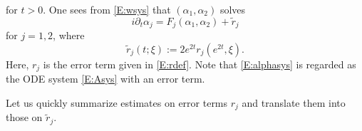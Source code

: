 \documentclass[11pt,a4paper,oneside]{amsart}
\theoremstyle{plain}
\theoremstyle{remark}
\numberwithin{equation}{section}
\theoremstyle{definition}
\begin{document}
for $t >0$. 
One sees from \eqref{E:wsys} that $(\alpha_1,\alpha_2)$
solves
\begin{equation}\label{E:alphasys}
	i \partial_t \alpha_j
	= 
	 F_j(\alpha_1,\alpha_2) + \widetilde{r}_j
\end{equation}
for $j=1,2$, where
\begin{equation}\label{E:trdef}
\widetilde{r}_j(t;\xi) :=2e^{2t} r_j (e^{2t}, \xi).
\end{equation}
Here, $r_j$ is the error term given in \eqref{E:rdef}.
Note that \eqref{E:alphasys} is regarded as the ODE system \eqref{E:Asys}
with an error term.

Let us quickly summarize estimates on error terms $r_j$
and translate them into those on $\widetilde{r}_j$.
\end{document}
